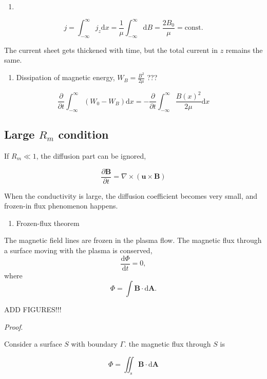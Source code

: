 \documentclass[
  notoc %
]{tufte-book}
\providecommand{\tightlist}{%
  \setlength{\itemsep}{0pt}\setlength{\parskip}{0pt}
}
\begin{document}
\begin{enumerate}
\def\labelenumi{\arabic{enumi}.}
\setcounter{enumi}{2}
\tightlist
\item
\end{enumerate}

\[
j=\int_{-\infty}^{\infty}j_z \mathrm{d}x=\frac{1}{\mu}\int_{-\infty}^{\infty}\mathrm{d}B=\frac{2B_0}{\mu}=\text{const.}
\]

The current sheet gets thickened with time, but the total current in
\(z\) remains the same.

\begin{enumerate}
\def\labelenumi{\arabic{enumi}.}
\setcounter{enumi}{3}
\tightlist
\item
  Dissipation of magnetic energy, \(W_B=\frac{B^2}{2\mu}\) ???
\end{enumerate}

\[
\frac{\partial}{\partial t}\int_{-\infty}^{\infty}(W_0-W_B)\mathrm{d}x=-\frac{\partial}{\partial t}\int_{-\infty}^{\infty}\frac{B(x)^2}{2\mu}\mathrm{d}x
\]

\hypertarget{large-r_m-condition}{%
\subsection{\texorpdfstring{Large \(R_m\)
condition}{Large R\_m condition}}\label{large-r_m-condition}}

If \(R_m\ll1\), the diffusion part can be ignored,

\[
\frac{\partial\mathbf{B}}{\partial t}=\nabla\times(\mathbf{u}\times\mathbf{B})
\]

When the conductivity is large, the diffusion coefficient becomes very
small, and frozen-in flux phenomenon happens.

\begin{enumerate}
\def\labelenumi{\arabic{enumi}.}
\tightlist
\item
  Frozen-flux theorem
\end{enumerate}

The magnetic field lines are frozen in the plasma flow. The magnetic
flux through a surface moving with the plasma is conserved, \[
\frac{\mathrm{d}\Phi}{\mathrm{d}t}=0,
\] where \[
\Phi=\int\mathbf{B}\cdot \mathrm{d}\mathbf{A}.
\]

ADD FIGURES!!!

\emph{Proof}.

Consider a surface \(S\) with boundary \(\Gamma\). the magnetic flux
through \(S\) is

\[
\Phi = \iint_s \mathbf{B}\cdot \mathrm{d}\mathbf{A}
\]
\end{document}
